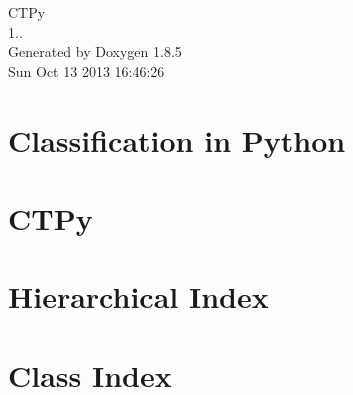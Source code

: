 \documentclass[twoside]{book}
\newcommand{\clearemptydoublepage}{%
  \newpage{\pagestyle{empty}\cleardoublepage}%
}
\begin{document}
\hypersetup{pageanchor=false}
\begin{titlepage}
\vspace*{7cm}
\begin{center}%
{\Large C\-T\-Py \\[1ex]\large 1.. }\\
\vspace*{1cm}
{\large Generated by Doxygen 1.8.5}\\
\vspace*{0.5cm}
{\small Sun Oct 13 2013 16:46:26}\\
\end{center}
\end{titlepage}
\clearemptydoublepage
\tableofcontents
\clearemptydoublepage
{}
\hypersetup{pageanchor=true}

\chapter{Classification in Python}
\label{md_doc_notes_classification}
\hypertarget{md_doc_notes_classification}{}

\chapter{C\-T\-Py}
\label{md__r_e_a_d_m_e}
\hypertarget{md__r_e_a_d_m_e}{}

\chapter{Hierarchical Index}

\chapter{Class Index}

\end{document}
